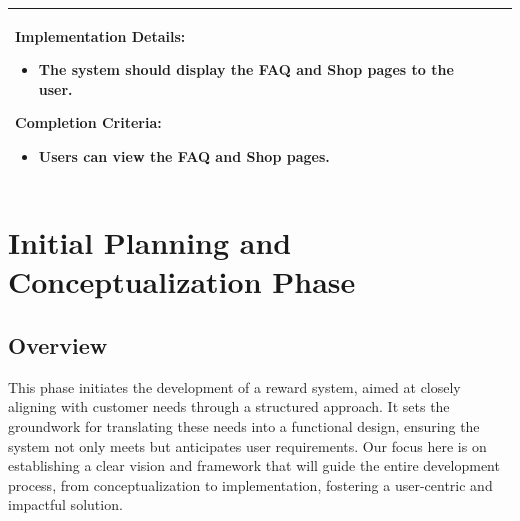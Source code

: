 \begin{longtable}{ | p{} | p{} | }
\begin{itemize}
    \end{itemize}
    \textbf{Implementation Details:} \newline
    \begin{itemize}
        \item The system should display the FAQ and Shop pages to the user.
    \end{itemize}
    \textbf{Completion Criteria:} \newline
    \begin{itemize}
        \item Users can view the FAQ and Shop pages.
    \end{itemize} \\
    \hline
\end{longtable}


\section{Initial Planning and Conceptualization Phase}

\subsection{Overview}
This phase initiates the development of a reward system, aimed at closely aligning with customer needs through a structured approach. It sets the groundwork for translating these needs into a functional design, ensuring the system not only meets but anticipates user requirements. Our focus here is on establishing a clear vision and framework that will guide the entire development process, from conceptualization to implementation, fostering a user-centric and impactful solution.

